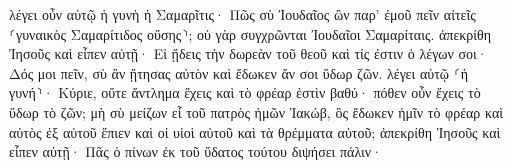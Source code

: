 \documentclass{openreader}
\begin{document}
λέγει οὖν αὐτῷ ἡ γυνὴ ἡ Σαμαρῖτις· Πῶς σὺ Ἰουδαῖος ὢν παρ’ ἐμοῦ πεῖν αἰτεῖς ⸂γυναικὸς Σαμαρίτιδος οὔσης⸃; οὐ γὰρ συγχρῶνται Ἰουδαῖοι Σαμαρίταις. 
ἀπεκρίθη Ἰησοῦς καὶ εἶπεν αὐτῇ· Εἰ ᾔδεις τὴν δωρεὰν τοῦ θεοῦ καὶ τίς ἐστιν ὁ λέγων σοι· Δός μοι πεῖν, σὺ ἂν ᾔτησας αὐτὸν καὶ ἔδωκεν ἄν σοι ὕδωρ ζῶν. 
λέγει αὐτῷ ⸂ἡ γυνή⸃· Κύριε, οὔτε ἄντλημα ἔχεις καὶ τὸ φρέαρ ἐστὶν βαθύ· πόθεν οὖν ἔχεις τὸ ὕδωρ τὸ ζῶν; 
μὴ σὺ μείζων εἶ τοῦ πατρὸς ἡμῶν Ἰακώβ, ὃς ἔδωκεν ἡμῖν τὸ φρέαρ καὶ αὐτὸς ἐξ αὐτοῦ ἔπιεν καὶ οἱ υἱοὶ αὐτοῦ καὶ τὰ θρέμματα αὐτοῦ; 
ἀπεκρίθη Ἰησοῦς καὶ εἶπεν αὐτῇ· Πᾶς ὁ πίνων ἐκ τοῦ ὕδατος τούτου διψήσει πάλιν· 
\end{document}
